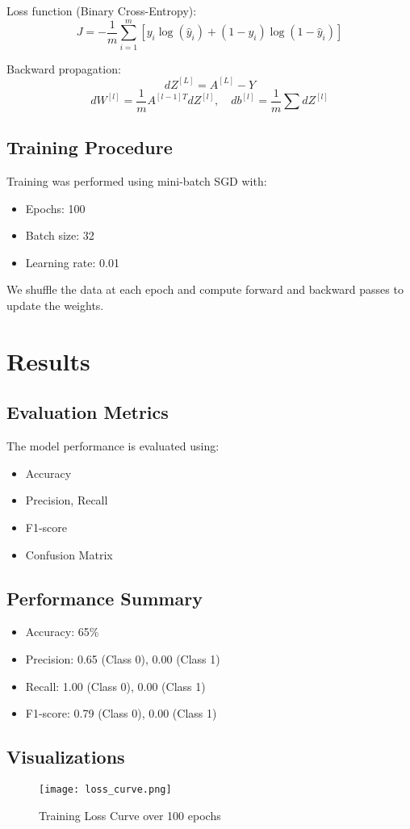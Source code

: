 \documentclass[12pt]{article}
\begin{document}
Loss function (Binary Cross-Entropy):
\[
J = -\frac{1}{m} \sum_{i=1}^{m} \left[y_i \log(\hat{y}_i) + (1 - y_i) \log(1 - \hat{y}_i)\right]
\]

Backward propagation:
\[
dZ^{[L]} = A^{[L]} - Y
\]
\[
dW^{[l]} = \frac{1}{m} A^{[l-1]T} dZ^{[l]}, \quad db^{[l]} = \frac{1}{m} \sum dZ^{[l]}
\]

\subsection{Training Procedure}
Training was performed using mini-batch SGD with:
\begin{itemize}
    \item Epochs: 100
    \item Batch size: 32
    \item Learning rate: 0.01
\end{itemize}
We shuffle the data at each epoch and compute forward and backward passes to update the weights.

\section{Results}
\subsection{Evaluation Metrics}
The model performance is evaluated using:
\begin{itemize}
    \item Accuracy
    \item Precision, Recall
    \item F1-score
    \item Confusion Matrix
\end{itemize}

\subsection{Performance Summary}
\begin{itemize}
    \item Accuracy: 65\%
    \item Precision: 0.65 (Class 0), 0.00 (Class 1)
    \item Recall: 1.00 (Class 0), 0.00 (Class 1)
    \item F1-score: 0.79 (Class 0), 0.00 (Class 1)
\end{itemize}

\subsection{Visualizations}
\begin{figure}[H]
\centering
\texttt{[image: loss\_curve.png]}
\caption{Training Loss Curve over 100 epochs}
\end{figure}
\end{document}
